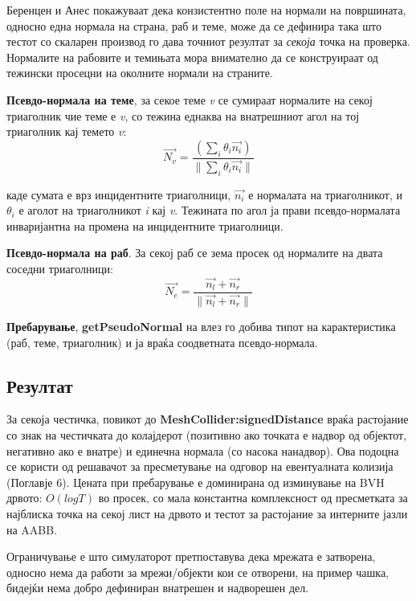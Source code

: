 Беренцен и Анес \cite{baerentzen2005signed} покажуваат дека конзистентно поле на нормали на површината, односно една нормала на страна, раб и теме, може да се дефинира така што тестот со скаларен производ го дава точниот резултат за \textit{секоја} точка на проверка. Нормалите на рабовите и темињата мора внимателно да се конструираат од тежински просецни на околните нормали на страните.

\textbf{Псевдо-нормала на теме}, за секое теме \textit{v} се сумираат нормалите на секој триаголник чие теме е \textit{v}, со тежина еднаква на внатрешниот агол на тој триаголник кај темето \textit{v}:
$$\vec{N_v} = \frac{(\sum_i \theta_i \vec{n_i})}{\lVert \sum_i \theta_i \vec{n_i} \rVert}$$

каде сумата е врз инцидентните триаголници, $\vec{n_i}$ е нормалата на триаголникот, и $\theta_i$ е аголот на триаголникот \textit{i} кај \textit{v}. Тежината по агол ја прави псевдо-нормалата инваријантна на промена на инцидентните триаголници.

\textbf{Псевдо-нормала на раб}. За секој раб се зема просек од нормалите на двата соседни триаголници:
$$\vec{N_e} = \frac{\vec{n_{l}} + \vec{n_{r}}}{\lVert \vec{n_{l}} + \vec{n_{r}} \rVert}$$

\textbf{Пребарување}, \textbf{getPseudoNormal} на влез го добива типот на карактеристика (раб, теме, триаголник) и ја враќа соодветната псевдо-нормала.

\subsection{Резултат}
За секоја честичка, повикот до \textbf{MeshCollider:signedDistance} враќа растојание со знак на честичката до колајдерот (позитивно ако точката е надвор од објектот, негативно ако е внатре) и единечна нормала (со насока нанадвор). Ова подоцна се користи од решавачот за пресметување на одговор на евентуалната колизија (Поглавје 6). Цената при пребарување е доминирана од изминување на BVH дрвото: $O(log T)$ во просек, со мала константна комплексност од пресметката за најблиска точка на секој лист на дрвото и тестот за растојание за интерните јазли на AABB.

Ограничување е што симулаторот претпоставува дека мрежата е затворена, односно нема да работи за мрежи/објекти кои се отворени, на пример чашка, бидејќи нема добро дефиниран внатрешен и надворешен дел.